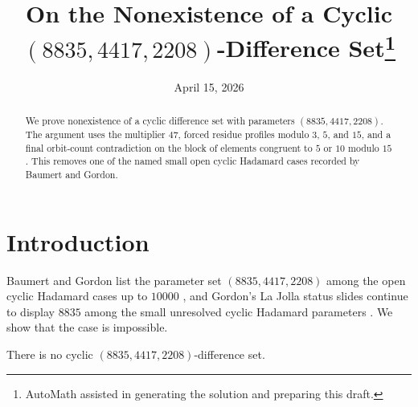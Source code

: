 \documentclass[11pt]{amsart}
\begin{document}
\title[No Cyclic $(8835,4417,2208)$ Difference Set]{On the Nonexistence of a Cyclic $(8835,4417,2208)$-Difference Set\thanks{AutoMath assisted in generating the solution and preparing this draft.}}
\date{April 15, 2026}

\begin{abstract}
We prove nonexistence of a cyclic difference set with parameters $(8835,4417,2208)$.
The argument uses the multiplier $47$, forced residue profiles modulo $3$, $5$, and $15$, and a final orbit-count contradiction on the block of elements congruent to $5$ or $10$ modulo $15$.
This removes one of the named small open cyclic Hadamard cases recorded by Baumert and Gordon.
\end{abstract}

\maketitle

\section{Introduction}
Baumert and Gordon list the parameter set $(8835,4417,2208)$ among the open cyclic Hadamard cases up to $10000$ \cite{BG2004}, and Gordon's La Jolla status slides continue to display $8835$ among the small unresolved cyclic Hadamard parameters \cite{Gordon2019}.
We show that the case is impossible.

\begin{theorem}
There is no cyclic $(8835,4417,2208)$-difference set.
\end{theorem}
\end{document}
